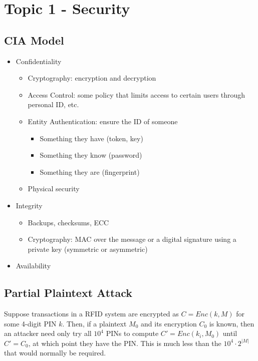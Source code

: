 \documentclass[11pt]{report}
\begin{document}
\chapter{Topic 1 - Security}
\section{CIA Model}
\begin{itemize}
	\item Confidentiality
	\begin{itemize}
		\item Cryptography: encryption and decryption
		\item Access Control: some policy that limits access to certain users through personal ID, etc.
		\item Entity Authentication: ensure the ID of someone
		\begin{itemize}
			\item Something they have (token, key)
			\item Something they know (password)
			\item Something they are (fingerprint)
		\end{itemize}
		\item Physical security
	\end{itemize}
	\item Integrity
	\begin{itemize}
		\item Backups, checksums, ECC
		\item Cryptography: MAC over the message or a digital signature using a private key (symmetric or asymmetric)
	\end{itemize}
	\item Availability
\end{itemize}

\section{Partial Plaintext Attack}
Suppose transactions in a RFID system are encrypted as $C = Enc(k, M)$ for some 4-digit PIN $k$. Then, if a plaintext $M_0$ and its encryption $C_0$ is known, then an attacker need only try all $10^4$ PINs to compute $C' = Enc(k_i, M_0)$ until $C' = C_0$, at which point they have the PIN. This is much less than the $10^4 \cdot 2^{|M|}$ that would normally be required.
\end{document}
